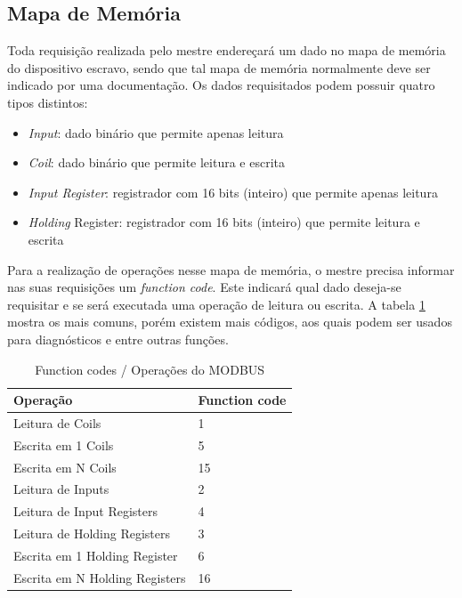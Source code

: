     \subsection{Mapa de Memória}

      Toda requisição realizada pelo mestre endereçará um dado no mapa de memória do dispositivo escravo, sendo que tal mapa de memória normalmente deve ser indicado por uma documentação. Os dados requisitados podem possuir quatro tipos distintos:

      \begin{itemize}
        \item \textit{Input}: dado binário que permite apenas leitura
        \item \textit{Coil}: dado binário que permite leitura e escrita
        \item \textit{Input Register}: registrador com 16 bits (inteiro) que permite apenas leitura
        \item \textit{Holding} Register: registrador com 16 bits (inteiro) que permite leitura e escrita
      \end{itemize}

      Para a realização de operações nesse mapa de memória, o mestre precisa informar nas suas requisições um \textit{function code}. Este indicará qual dado deseja-se requisitar e se será executada uma operação de leitura ou escrita. A tabela \ref{table:modbus-funccodes} mostra os mais comuns, porém existem mais códigos, aos quais podem ser usados para diagnósticos e entre outras funções.

      \begin{table}[]
        \centering
        \caption{Function codes / Operações do MODBUS}
        \label{table:modbus-funccodes}
        \begin{tabular}{@{}ll@{}}
          \toprule
          \textbf{Operação}              & \textbf{Function code} \\ \midrule
          Leitura de Coils               & 1                      \\
          Escrita em 1 Coils             & 5                      \\
          Escrita em N Coils             & 15                     \\
          Leitura de Inputs              & 2                      \\
          Leitura de Input Registers     & 4                      \\
          Leitura de Holding Registers   & 3                      \\
          Escrita em 1 Holding Register  & 6                      \\
          Escrita em N Holding Registers & 16                     \\ \bottomrule
        \end{tabular}
      \end{table}

